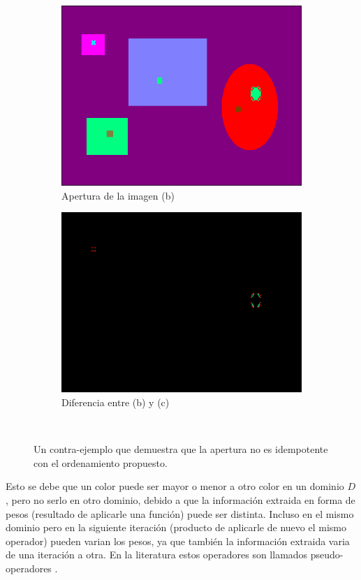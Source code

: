 \begin{figure}
{\begin{subfigure}[b]{0.25\textwidth}
			\includegraphics[width=0.95\linewidth]{fig/Apertura2.png}
			\caption{Apertura de la imagen (b)}
			\label{fig:Apert2}
		\end{subfigure}
		\begin{subfigure}[b]{0.25\textwidth}
			\centering
			\includegraphics[width=0.95\linewidth]{fig/DiferenciaApertura.png}
			\caption{Diferencia entre (b) y (c)}
			\label{fig:Apert1}
		\end{subfigure}
	}\\
	\caption{Un contra-ejemplo que demuestra que la apertura no es idempotente con el ordenamiento propuesto.}	
	\label{fig:ContraEjemplo}
\end{figure}

Esto se debe que un color puede ser mayor o menor a otro color en un dominio $D$, pero no serlo en otro dominio, debido a que la información extraida en forma de pesos (resultado de aplicarle una función) puede ser distinta. Incluso en el mismo dominio pero en la siguiente iteración (producto de aplicarle de nuevo el mismo operador) pueden varian los pesos, ya que también la información extraida varia de una iteración a otra. En la literatura estos operadores son llamados pseudo-operadores \cite{hanbury2001morphological,aptoula2007pseudo,aptoula2008alpha,angulo2010pseudo,chen2002pseudo}. 

